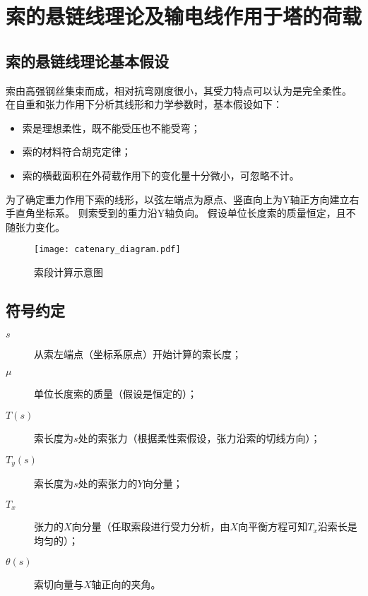 \section{索的悬链线理论及输电线作用于塔的荷载}

\subsection{索的悬链线理论基本假设}
索由高强钢丝集束而成，相对抗弯刚度很小，其受力特点可以认为是完全柔性。
在自重和张力作用下分析其线形和力学参数时，基本假设如下：
\begin{itemize}
\item
索是理想柔性，既不能受压也不能受弯；
\item
索的材料符合胡克定律；
\item
索的横截面积在外荷载作用下的变化量十分微小，可忽略不计。
\end{itemize}

为了确定重力作用下索的线形，以弦左端点为原点、竖直向上为Y轴正方向建立右手直角坐标系。
则索受到的重力沿Y轴负向。
假设单位长度索的质量恒定，且不随张力变化。

\begin{figure}[!htbp]
  \centering
  \texttt{[image: catenary\_diagram.pdf]}
  \label{fig:catenary}
  \caption{索段计算示意图}
\end{figure}

\subsection{符号约定}
\begin{description}
  \item[$s$]
  从索左端点（坐标系原点）开始计算的索长度；
  \item[$\mu$]
  单位长度索的质量（假设是恒定的）；
  \item[$T(s)$]
  索长度为$s$处的索张力（根据柔性索假设，张力沿索的切线方向）；
  \item[$T_y(s)$]
  索长度为$s$处的索张力的$Y$向分量；
  \item[$T_x$]
  张力的$X$向分量（任取索段进行受力分析，由$X$向平衡方程可知$T_x$沿索长是均匀的）；
  \item[$\theta(s)$]
  索切向量与$X$轴正向的夹角。
\end{description}

